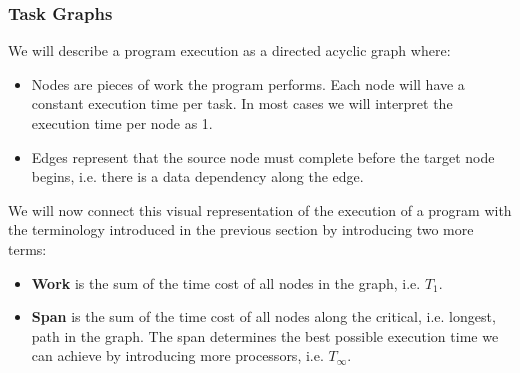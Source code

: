 \documentclass[main.tex]{subfiles}
\begin{document}
\subsubsection{Task Graphs} \label{Task Graphs}
We will describe a program execution as a directed acyclic graph where:
\begin{itemize}
    \item Nodes are pieces of work the program performs. Each node will have a constant execution time per task. In most cases we will interpret the execution time per node as 1.
    \item Edges represent that the source node must complete before the target node begins, i.e. there is a data dependency along the edge.
\end{itemize}
We will now connect this visual representation of the execution of a program with the terminology introduced in the previous section by introducing two more terms:
\begin{itemize}
    \item \textbf{Work} is the sum of the time cost of all nodes in the graph, i.e. $T_1$.
    \item  \textbf{Span} is the sum of the time cost of all nodes along the critical, i.e. longest, path in the graph. The span determines the best possible execution time we can achieve by introducing more processors, i.e. $T_\infty$.
\end{itemize}
\end{document}
